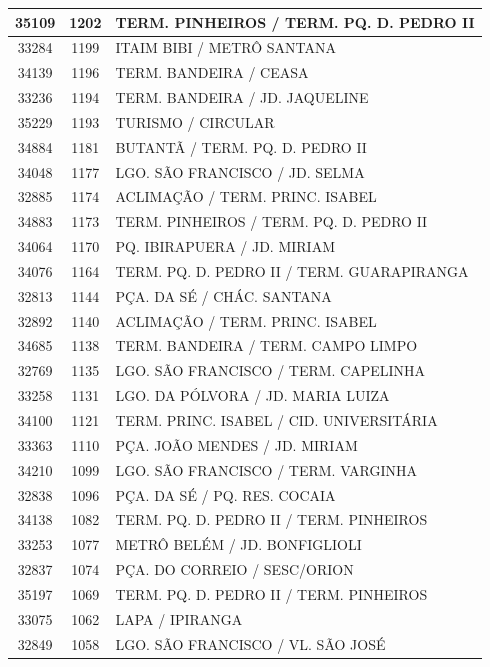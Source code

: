 \documentclass[
	12pt,				%
	oneside,			%
	a4paper,			%
	english,			%
	brazil				%
	]{abntex2ppgsi}
\begin{document}
{{\begin{apendicesenv}
\begin{longtable}{c|c|p{7cm}}
 \hline 
35109 &	1202 &	TERM. PINHEIROS / TERM. PQ. D. PEDRO II \\ 
 \hline 
33284 &	1199 &	ITAIM BIBI / METRÔ SANTANA \\ 
 \hline 
34139 &	1196 &	TERM. BANDEIRA / CEASA \\ 
 \hline 
33236 &	1194 &	TERM. BANDEIRA / JD. JAQUELINE \\ 
 \hline 
35229 &	1193 &	TURISMO / CIRCULAR \\ 
 \hline 
34884 &	1181 &	BUTANTÃ / TERM. PQ. D. PEDRO II \\ 
 \hline 
34048 &	1177 &	LGO. SÃO FRANCISCO / JD. SELMA \\ 
 \hline 
32885 &	1174 &	ACLIMAÇÃO / TERM. PRINC. ISABEL \\ 
 \hline 
34883 &	1173 &	TERM. PINHEIROS / TERM. PQ. D. PEDRO II \\ 
 \hline 
34064 &	1170 &	PQ. IBIRAPUERA / JD. MIRIAM \\ 
 \hline 
34076 &	1164 &	TERM. PQ. D. PEDRO II / TERM. GUARAPIRANGA \\ 
 \hline 
32813 &	1144 &	PÇA. DA SÉ / CHÁC. SANTANA \\ 
 \hline 
32892 &	1140 &	ACLIMAÇÃO / TERM. PRINC. ISABEL \\ 
 \hline 
34685 &	1138 &	TERM. BANDEIRA / TERM. CAMPO LIMPO \\ 
 \hline 
32769 &	1135 &	LGO. SÃO FRANCISCO / TERM. CAPELINHA \\ 
 \hline 
33258 &	1131 &	LGO. DA PÓLVORA / JD. MARIA LUIZA \\ 
 \hline 
34100 &	1121 &	TERM. PRINC. ISABEL / CID. UNIVERSITÁRIA \\ 
 \hline 
33363 &	1110 &	PÇA. JOÃO MENDES / JD. MIRIAM \\ 
 \hline 
34210 &	1099 &	LGO. SÃO FRANCISCO / TERM. VARGINHA \\ 
 \hline 
32838 &	1096 &	PÇA. DA SÉ / PQ. RES. COCAIA \\ 
 \hline 
34138 &	1082 &	TERM. PQ. D. PEDRO II / TERM. PINHEIROS \\ 
 \hline 
33253 &	1077 &	METRÔ BELÉM / JD. BONFIGLIOLI \\ 
 \hline 
32837 &	1074 &	PÇA. DO CORREIO / SESC/ORION \\ 
 \hline 
35197 &	1069 &	TERM. PQ. D. PEDRO II / TERM. PINHEIROS \\ 
 \hline 
33075 &	1062 &	LAPA / IPIRANGA \\ 
 \hline 
32849 &	1058 &	LGO. SÃO FRANCISCO / VL. SÃO JOSÉ \\ 

\end{longtable}
\end{apendicesenv}}}
\end{document}
